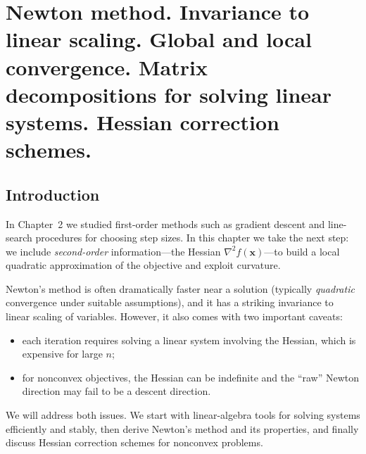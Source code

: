 \chapter{Newton method. Invariance to linear scaling. Global and local convergence. Matrix decompositions for solving linear systems. Hessian correction schemes.}

\graphicspath{{chapters/03_newton_method/figures}}
\begin{abstract}
We introduce Newton's method as a second-order optimization scheme based on
local quadratic models. We explain why Newton steps require solving linear
systems and review standard matrix factorizations (Cholesky, LDL, LU, QR, and
spectral decompositions) that are used in practice. We then study two key
theoretical properties: invariance of Newton iterates under linear changes of
variables, and global vs.\ local convergence behavior. Finally, we discuss
practical Hessian correction schemes that make Newton-like methods robust on
nonconvex objectives, and illustrate the ideas on the Rosenbrock function and a
one-dimensional example where Newton loses quadratic convergence.
\end{abstract}

\section{Introduction}
In Chapter~2 we studied first-order methods such as gradient descent and
line-search procedures for choosing step sizes. In this chapter we take the
next step: we include \emph{second-order} information---the Hessian
$\nabla^2 f(\mathbf{x})$---to build a local quadratic approximation of the
objective and exploit curvature.

Newton's method is often dramatically faster near a solution (typically
\emph{quadratic} convergence under suitable assumptions), and it has a striking
invariance to linear scaling of variables. However, it also comes with two
important caveats:
\begin{itemize}
  \item each iteration requires solving a linear system involving the Hessian,
  which is expensive for large $n$;
  \item for nonconvex objectives, the Hessian can be indefinite and the ``raw''
  Newton direction may fail to be a descent direction.
\end{itemize}
We will address both issues. We start with linear-algebra tools for solving
systems efficiently and stably, then derive Newton's method and its properties,
and finally discuss Hessian correction schemes for nonconvex problems.

